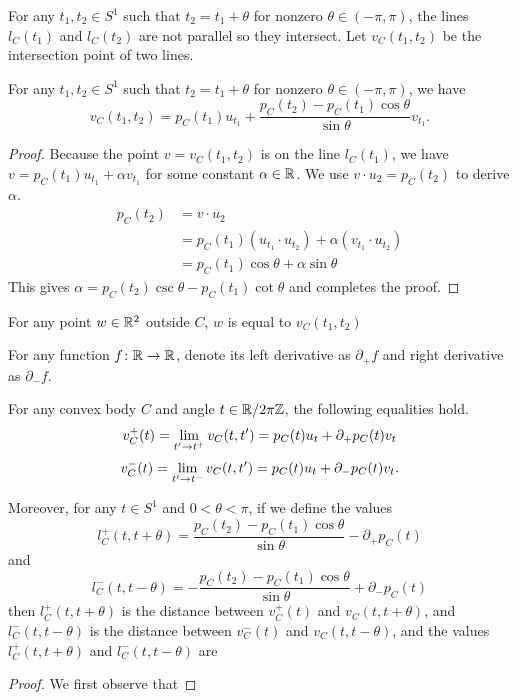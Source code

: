 \begin{definition}
For any $t_1, t_2 \in S^1$ such that $t_2 = t_1 + \theta$ for nonzero $\theta \in (-\pi, \pi)$,
the lines $l_C(t_1)$ and $l_C(t_2)$ are not parallel so they intersect.
Let $v_C(t_1, t_2)$ be the intersection point of two lines.
\end{definition}
\begin{proposition}
For any $t_1, t_2 \in S^1$ such that $t_2 = t_1 + \theta$ for nonzero $\theta \in (-\pi, \pi)$, we have 
$$
v_C(t_1, t_2) = p_C(t_1) u_{t_1} + \frac{p_C(t_2) - p_C(t_1) \cos \theta}{\sin \theta} v_{t_1}.
$$
\end{proposition}
\begin{proof}
Because the point $v = v_C(t_1, t_2)$ is on the line $l_C(t_1)$,
we have $v = p_C(t_1) u_{t_1} + \alpha v_{t_1}$
for some constant $\alpha \in \mathbb{R}$.
We use $v \cdot u_2 = p_C(t_2)$ to derive $\alpha$.
\begin{align*}
p_C(t_2) &= v \cdot u_2 \\
&= p_C(t_1) (u_{t_1} \cdot u_{t_2}) + \alpha (v_{t_1} \cdot u_{t_2}) \\
&= p_C(t_1) \cos \theta + \alpha \sin \theta
\end{align*}
This gives $\alpha = p_C(t_2) \csc \theta - p_C(t_1) \cot \theta$ and completes the proof.
\end{proof}

\begin{proposition}
For any point $w \in \mathbb{R}^2$ outside $C$, $w$ is equal to $v_C(t_1, t_2)$	
\end{proposition}


\begin{definition}
For any function $f \colon \mathbb{R} \rightarrow \mathbb{R}$, denote its left derivative as $\partial_+f$ and right derivative as $\partial_- f$.
\end{definition}
\begin{proposition}
For any convex body $C$ and angle $t \in \mathbb{R} / 2 \pi \mathbb{Z}$,
the following equalities hold.
$$v_C^+(t) = \lim_{t' \rightarrow t^+} v_C(t, t') = p_C(t)u_t + \partial_+p_C(t)v_t$$
$$v_C^-(t) = \lim_{t' \rightarrow t^-} v_C(t, t') = p_C(t)u_t + \partial_-p_C(t)v_t.$$

Moreover, 
for any $t \in S^1$ and $0 < \theta < \pi$,
if we define the values
$$l_C^+(t, t+\theta) = \frac{p_C(t_2) - p_C(t_1) \cos \theta}{\sin \theta} - \partial_+p_C(t)$$
and
$$l_C^-(t, t-\theta) = -\frac{p_C(t_2) - p_C(t_1) \cos \theta}{\sin \theta} + \partial_-p_C(t)$$
then $l_C^+(t, t+\theta)$ is the distance between $v^+_C(t)$ and $v_C(t, t+\theta)$,
and $l_C^-(t, t-\theta)$ is the distance
between $v^-_C(t)$ and $v_C(t, t-\theta)$,
and the values $l_C^+(t, t+\theta)$ and 
$l_C^-(t, t-\theta)$ are 
\end{proposition}
\begin{proof}
We first observe that 
\end{proof}

